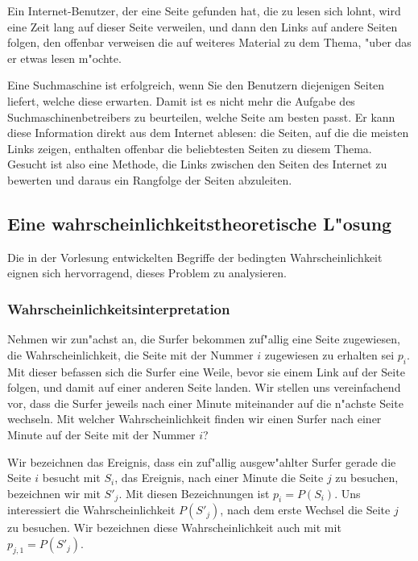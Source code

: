 Ein Internet-Benutzer, der eine Seite gefunden hat, die zu lesen sich lohnt,
wird eine Zeit lang auf dieser Seite verweilen, und dann den Links auf
andere Seiten folgen, den offenbar verweisen die auf weiteres Material zu
dem Thema, "uber das er etwas lesen m"ochte.

Eine Suchmaschine ist erfolgreich, wenn Sie den Benutzern diejenigen Seiten
liefert, welche diese erwarten.
Damit ist es nicht mehr die Aufgabe des
Suchmaschinenbetreibers zu beurteilen, welche Seite am besten passt.
Er
kann diese Information direkt aus dem Internet ablesen: die Seiten, auf die
die meisten Links zeigen, enthalten offenbar die beliebtesten Seiten zu diesem
Thema.
Gesucht ist also eine Methode, die Links zwischen den Seiten des
Internet zu bewerten und daraus ein Rangfolge der Seiten abzuleiten.

\subsection{Eine wahrscheinlichkeitstheoretische L"osung}
Die in der Vorlesung entwickelten Begriffe der bedingten Wahrscheinlichkeit
eignen sich hervorragend, dieses Problem zu analysieren.

\subsubsection{Wahrscheinlichkeitsinterpretation}
Nehmen wir zun"achst an, die Surfer bekommen zuf"allig eine Seite zugewiesen,
die Wahrscheinlichkeit, die Seite mit der Nummer $i$ zugewiesen zu erhalten
sei $p_i$.
Mit dieser befassen sich die Surfer eine Weile, bevor sie einem Link auf
der Seite folgen, und damit auf einer anderen Seite landen.
Wir stellen
uns vereinfachend vor, dass die Surfer jeweils nach einer Minute miteinander
auf die n"achste Seite wechseln.
Mit welcher Wahrscheinlichkeit finden wir
einen Surfer nach einer Minute auf der Seite mit der Nummer $i$?

Wir bezeichnen das Ereignis, dass ein zuf"allig ausgew"ahlter Surfer gerade
die Seite $i$ besucht mit $S_i$, das Ereignis, nach einer Minute die Seite
$j$ zu besuchen, bezeichnen wir mit $S'_j$.
Mit diesen Bezeichnungen ist
$p_i=P(S_i)$.
Uns interessiert die Wahrscheinlichkeit $P(S'_j)$, nach dem erste
Wechsel die Seite $j$ zu besuchen.
Wir bezeichnen diese Wahrscheinlichkeit
auch mit mit $p_{j,1} = P(S'_j)$.

